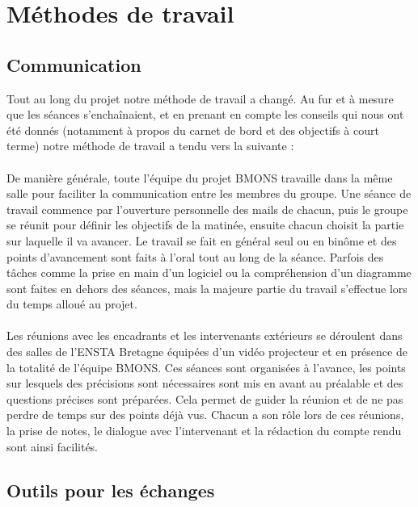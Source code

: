 \chapter{Méthodes de travail}


\section{Communication}
\vspace{1.0cm}
Tout au long du projet notre méthode de travail a changé. Au fur et à mesure que les séances s’enchaînaient, et en prenant en compte les conseils qui nous ont été donnés (notamment à propos du carnet de bord et des objectifs à court terme) notre méthode de travail a tendu vers la suivante : \\ \\
De manière générale, toute l'équipe du projet BMONS travaille dans la même salle pour faciliter la communication entre les membres du groupe. Une séance de travail commence par l'ouverture personnelle des mails de chacun, puis le groupe se réunit pour définir les objectifs de la matinée, ensuite chacun choisit la partie sur laquelle il va avancer. Le travail se fait en général seul ou en binôme et des points d'avancement sont faits à l'oral tout au long de la séance. Parfois des tâches comme la prise en main d'un logiciel ou la compréhension d'un diagramme sont faites en dehors des séances, mais la majeure partie du travail s'effectue lors du temps alloué au projet. \\ \\
Les réunions avec les encadrants et les intervenants extérieurs se déroulent dans des salles de l'ENSTA Bretagne équipées d'un vidéo projecteur et en présence de la totalité de l'équipe BMONS. Ces séances sont organisées à l'avance, les points sur lesquels des précisions sont nécessaires sont mis en avant au préalable et des questions précises sont préparées. Cela permet de guider la réunion et de ne pas perdre de temps sur des points déjà vus. Chacun a son rôle lors de ces réunions, la prise de notes, le dialogue avec l'intervenant et la rédaction du compte rendu sont ainsi facilités.

\section{Outils pour les échanges}
\vspace{1.5cm}

